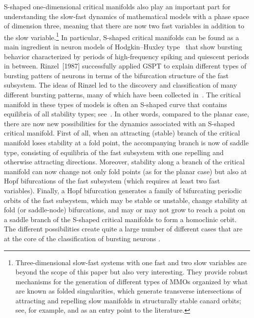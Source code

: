 \documentclass{ws-ijbc}
\begin{document}
S-shaped one-dimensional critical manifolds also play an important part for understanding the slow-fast dynamics of mathematical models with a phase space of dimension three, meaning that there are now two fast variables in addition to the slow variable.\footnote{Three-dimensional slow-fast systems with one fast and two slow variables are beyond the scope of this paper but also very interesting. They provide robust mechanisms for the generation of different types of MMOs organized by what are known as folded singularities, which generate transverse intersections of attracting and repelling slow manifolds in structurally stable canard orbits; see, for example, \cite{lents-rapides, SW} and \cite{MMO} as an entry point to the literature.} In particular, S-shaped critical manifolds can be found as a main ingredient in neuron models of Hodgkin--Huxley type~\cite{HH} that show bursting behavior characterized by periods of high-frequency spiking and quiescent periods in between. Rinzel~[1987] successfully applied GSPT to explain different types of bursting patters of neurons in terms of the bifurcation structure of the fast subsystem. The ideas of Rinzel led to the discovery and classification of many different bursting patterns, many of which have been collected in~\cite{izh00}. The critical manifold in these types of models is often an S-shaped curve that contains equilibria of all stability types; see~\cite{rinzel87}. In other words, compared to the planar case, there are now new possibilities for the dynamics associated with an S-shaped critical manifold. First of all, when an attracting (stable) branch of the critical manifold loses stability at a fold point, the accompanying branch is now of saddle type, consisting of equilibria of the fast subsystem with one repelling and otherwise attracting directions. Moreover, stability along a branch of the critical manifold can now change not only fold points (as for the planar case) but also at Hopf bifurcations of the fast subsystem (which requires at least two fast variables). Finally, a Hopf bifurcation generates a family of bifurcating periodic orbits of the fast subsystem, which may be stable or unstable, change stability at fold (or saddle-node) bifurcations, and may or may not grow to reach a point on a saddle branch of the S-shaped critical manifolds to form a homoclinic orbit. The different possibilities create quite a large number of different cases that are at the core of the classification of bursting neurons \cite{izh00,rinzel87}.
\end{document}
